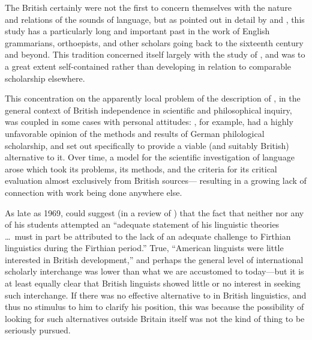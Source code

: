 The British certainly were not the first to concern themselves with
the nature and relations of the sounds of language, but as pointed out
in detail by \citet{firth46:english.school} and
\citet{abercrombie48:forgotten}, this study has a particularly long
and important past in the work of {English} grammarians, orthoepists,
and other scholars going back to the sixteenth century and
beyond. This tradition concerned itself largely with the study of
, and was to a great extent self-contained rather than
developing in relation to comparable scholarship elsewhere.

This concentration on the apparently local problem of the description
of , in the general context of British independence in
scientific and philosophical inquiry, was coupled in some cases with
personal attitudes: , for example, had a highly unfavorable
opinion of the methods and results of {German} philological scholarship,
and set out specifically to provide a viable (and suitably British)
alternative to it. Over time, a model for the scientific investigation
of language arose which took its problems, its methods, and the
criteria for its critical evaluation almost exclusively from British
sources— resulting in a growing lack of connection with work being
done anywhere else.

As late as 1969, \citeauthor{robins69:rvw.langendoen} could suggest
(in a review of \citealt{langendoen68:london.school}) that the fact
that neither {\Firth} nor any of his students attempted an ``adequate
statement of his linguistic theories \ldots\ must in part be
attributed to the lack of an adequate challenge to Firthian
linguistics during the Firthian period.'' True, ``American linguists
were little interested in British development,'' and perhaps the
general level of international scholarly interchange was lower than
what we are accustomed to today—but it is at least equally clear that
British linguists showed little or no interest in seeking such
interchange. If there was no effective alternative to {\Firth} in British
linguistics, and thus no stimulus to him to clarify his position, this
was because the possibility of looking for such alternatives outside
Britain itself was not the kind of thing to be seriously pursued.

